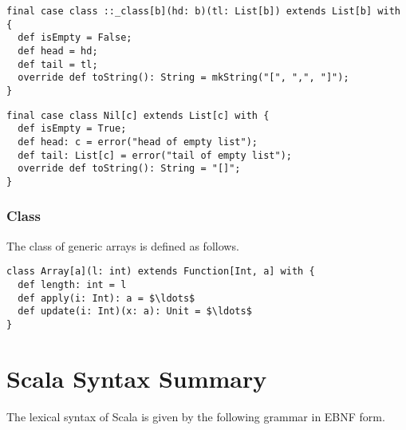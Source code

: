 \documentclass[a4paper,12pt,twoside,titlepage]{book}
\begin{document}
\begin{lstlisting}
final case class ::_class[b](hd: b)(tl: List[b]) extends List[b] with {
  def isEmpty = False;
  def head = hd;
  def tail = tl;
  override def toString(): String = mkString("[", ",", "]");
}
\end{lstlisting}
\begin{lstlisting}
final case class Nil[c] extends List[c] with {
  def isEmpty = True;
  def head: c = error("head of empty list");
  def tail: List[c] = error("tail of empty list");
  override def toString(): String = "[]";
}
\end{lstlisting}

\subsection{Class }

The class of generic arrays is defined as follows.

\begin{lstlisting}
class Array[a](l: int) extends Function[Int, a] with {
  def length: int = l
  def apply(i: Int): a = $\ldots$
  def update(i: Int)(x: a): Unit = $\ldots$
}
\end{lstlisting}

\appendix
\chapter{Scala Syntax Summary}

The lexical syntax of Scala is given by the following grammar in EBNF
form.
\end{document}
